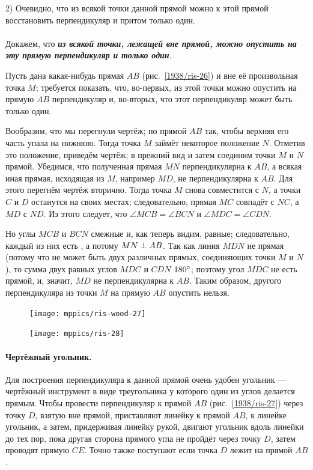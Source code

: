 \documentclass[twoside]{book}
\begin{document}
2) Очевидно, что из всякой точки данной прямой можно к этой прямой восстановить перпендикуляр и притом только один.

\paragraph{}\label{1938/24}
Докажем, что \textbf{\emph{из всякой точки, лежащей вне прямой, можно опустить на эту прямую перпендикуляр и только один}}.

Пусть дана какая-нибудь прямая $AB$ (рис.~\ref{1938/ris-26}) и вне её произвольная точка $M$;
требуется показать, что, во-первых, из этой точки можно опустить на прямую $AB$ перпендикуляр и, во-вторых, что этот перпендикуляр может быть только один.

Вообразим, что мы перегнули чертёж;
по прямой $AB$ так, чтобы верхняя его часть упала на нижнюю.
Тогда точка $M$ займёт некоторое положение $N$.
Отметив это положение, приведём чертёж;
в прежний вид и затем соединим точки $M$ и $N$ прямой.
Убедимся, что полученная прямая $MN$ перпендикулярна к $AB$, а всякая иная прямая, исходящая из $M$, например $MD$, не перпендикулярна к $AB$.
Для этого перегнём чертёж вторично.
Тогда точка $M$ снова совместится с $N$, а точки $C$ и $D$ останутся на своих местах;
следовательно, прямая $MC$ совпадёт с $NC$, а $MD$ с $ND$.
Из этого следует, что $\angle MCB = \angle BCN$ и $\angle MDC = \angle CDN$.

Но углы $MCB$ и $BCN$ смежные и, как теперь видим, равные;
следовательно, каждый из них есть , а потому $MN\z\perp AB$.
Так как линия $MDN$ не прямая (потому что не может быть двух различных прямых, соединяющих точки $M$ и $N$), то сумма двух равных углов $MDC$ и $CDN$  $180\degree$;
поэтому угол $MDC$ не есть прямой, и, значит, $MD$ не перпендикулярна к $AB$.
Таким образом, другого перпендикуляра из точки $M$ на прямую $AB$ опустить нельзя.

\begin{figure}
\centering
\texttt{[image: mppics/ris-wood-27]}
\caption{}\label{1938/ris-27}
\bigskip
\texttt{[image: mppics/ris-28]}
\caption{}\label{1938/ris-28}
\end{figure}

\paragraph{Чертёжный угольник.}\label{1938/25} 
Для построения перпендикуляра к данной прямой очень удобен угольник — чертёжный инструмент в виде треугольника у которого один из углов делается прямым.
Чтобы провести перпендикуляр к прямой $AB$ (рис.~\ref{1938/ris-27}) через точку $D$, взятую вне прямой, приставляют линейку к прямой $AB$, к линейке угольник, а затем, придерживая линейку рукой, двигают угольник вдоль линейки до тех пор, пока другая сторона прямого угла не пройдёт через точку $D$, затем проводят прямую $CE$.
Точно также поступают если точка $D$ лежит на прямой $AB$.
\end{document}
